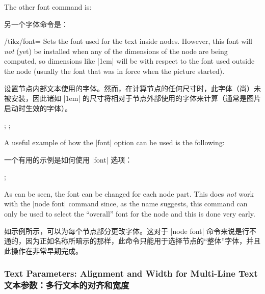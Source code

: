 The other font command is:

另一个字体命令是：
\begin{key}{/tikz/font=}
    Sets the font used for the text inside nodes. However, this font will
    \emph{not} (yet) be installed when any of the dimensions of the node are
    being computed, so dimensions like |1em| will be with respect to the font
    used outside the node (usually the font that was in force when the picture
    started).
    
    设置节点内部文本使用的字体。然而，在计算节点的任何尺寸时，此字体（尚）未被安装，因此诸如 |1em| 的尺寸将相对于节点外部使用的字体来计算（通常是图片启动时生效的字体）。
\begin{codeexample}[]
\end{codeexample}

\begin{codeexample}[]
\tikz {};
\tikz {};
\end{codeexample}

    A useful example of how the |font| option can be used is the following:
    
    一个有用的示例是如何使用 |font| 选项：
\begin{codeexample}[preamble={\usetikzlibrary{shapes.multipart}}]
\tikz [every text node part/.style={font=\itshape},
       every lower node part/.style={font=\footnotesize}]
  ;
\end{codeexample}

    As can be seen, the font can be changed for each node part. This does
    \emph{not} work with the |node font| command since, as the name suggests,
    this command can only be used to select the ``overall'' font for the node
    and this is done very early.

    如示例所示，可以为每个节点部分更改字体。这对于 |node font| 命令来说是行不通的，因为正如名称所暗示的那样，此命令只能用于选择节点的“整体”字体，并且此操作在非常早期完成。

\end{key}


\subsubsection{Text Parameters: Alignment and Width for Multi-Line Text\\文本参数：多行文本的对齐和宽度}

